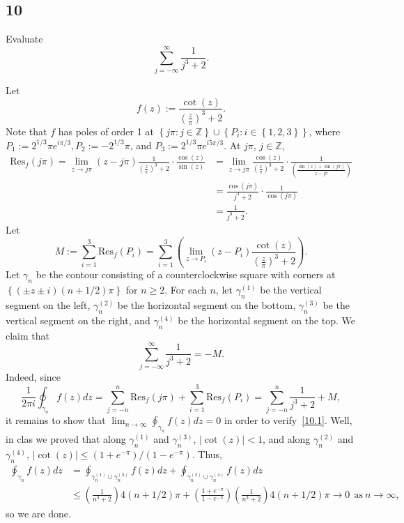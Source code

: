 \documentclass[12pt]{article}
\begin{document}
\subsection*{10}
\begin{tcolorbox}
Evaluate
\[ \sum_{j=-\infty}^{\infty}\frac{1}{j^{3} + 2}. \]
\end{tcolorbox}
Let
\[ f(z) := \frac{\cot(z)}{\left( \frac{z}{\pi} \right)^{3} + 2}. \]
Note that $f$ has poles of order 1 at $\left\{ j\pi : j \in \mathbb{Z} \right\}\cup \left\{ P_{i} : i \in \left\{ 1,2,3 \right\} \right\}$,
where $P_{1} := 2^{1/3}\pi e^{i\pi/3}, P_{2} := -2^{1/3}\pi$, and $P_{3} := 2^{1/3}\pi e^{i5\pi /3}$.
At $j\pi$, $j \in \mathbb{Z}$,
\begin{align*}
\text{Res}_{f}(j\pi) = \lim_{z \rightarrow j\pi}(z - j\pi)\frac{1}{\left( \frac{z}{\pi} \right)^{3} + 2}\cdot \frac{\cos(z)}{\sin(z)} & =
\lim_{z\rightarrow j\pi} \frac{\cos(z)}{\left( \frac{z}{\pi} \right)^{3} + 2}\cdot \frac{1}{\left( \frac{\sin(z) + \sin(j\pi)}{z - j\pi} \right)} \\
& = \frac{\cos(j\pi)}{j^{3} + 2}\cdot \frac{1}{\cos(j\pi)} \\
& = \frac{1}{j^{3} + 2}.
\end{align*}
Let
\[ M := \sum_{i=1}^{3}\text{Res}_{f}(P_{i}) = \sum_{i=1}^{3}\left( \lim_{z \rightarrow P_{i}} (z - P_{i})\frac{\cot(z)}{\left( \frac{z}{\pi}
\right)^{3} + 2}\right). \]
Let $\gamma_n$ be the contour consisting of a counterclockwise square with corners at $\left\{ (\pm z \pm i)(n+1/2)\pi \right\}$ for $n \geq 2$. For
each $n$, let
$\gamma_{n}^{(1)}$ be the vertical segment on the left, $\gamma_{n}^{(2)}$ be the horizontal segment on the bottom, $\gamma_{n}^{(3)}$ be the vertical
segment on the right, and $\gamma_{n}^{(4)}$ be the horizontal segment on the top.
We claim that
\begin{equation}
\sum_{j=-\infty}^{\infty}\frac{1}{j^{3} + 2} = - M.
\label{10.1}
\end{equation}
Indeed, since
\[ \frac{1}{2\pi i}\oint_{\gamma_n}f(z)dz = \sum_{j=-n}^{n}\text{Res}_{f}(j\pi) + \sum_{i=1}^{3}\text{Res}_{f}(P_{i}) = \sum_{j=-n}^{n}\frac{1}{j^{3}
+ 2} + M, \]
it remains to show that $\lim_{n\rightarrow \infty}\oint_{\gamma_{n}}f(z)dz = 0$ in order to verify~\eqref{10.1}. Well, in clas we proved that along
$\gamma_{n}^{(1)}$ and $\gamma_{n}^{(3)}$, $|\cot(z)| < 1$, and along $\gamma_{n}^{(2)}$ and $\gamma_{n}^{(4)}$, $|\cot(z)| \leq (1 + e^{-\pi}) / (1 -
e^{-\pi})$. Thus,
\begin{align*}
\oint_{\gamma_{n}}f(z)dz & = \oint_{\gamma_{n}^{(1)}\cup\gamma_{n}^{(3)}}f(z)dz + \oint_{\gamma_{n}^{(2)}\cup\gamma_{n}^{(4)}}f(z)dz \\
& \leq \left(\frac{1}{n^{3} + 2}\right) 4(n + 1/2)\pi + \left( \frac{1 + e^{-\pi}}{1 - e^{-\pi}} \right)\left( \frac{1}{n^{3} + 2} \right)4(n + 1/2)\pi
\rightarrow 0 \ \ \text{as}\  n\rightarrow \infty,
\end{align*}
so we are done.
\end{document}
